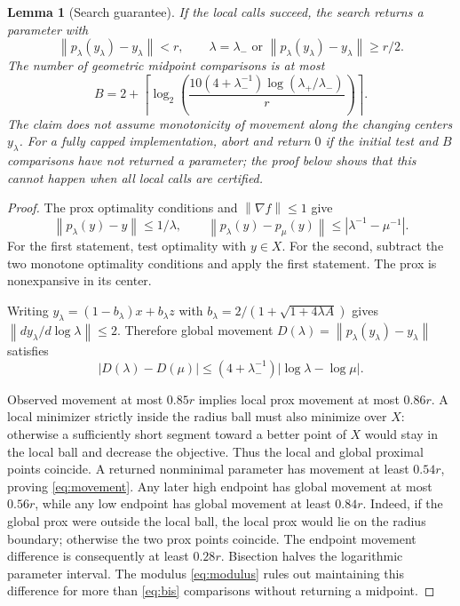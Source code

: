 \documentclass[11pt,a4paper]{article}
\newtheorem{lemma}[theorem]{Lemma}
\theoremstyle{definition}\newtheorem{definition}[theorem]{Definition}
\theoremstyle{remark}\newtheorem{remark}[theorem]{Remark}
\newcommand{\norm}[1]{\left\|#1\right\|}
\begin{document}
\begin{lemma}[Search guarantee]\label{lem:search}
If the local calls succeed, the search returns a parameter with
\begin{equation}\label{eq:movement}
 \norm{p_\lambda(y_\lambda)-y_\lambda}<r,
 \qquad \lambda=\lambda_-\text{ or }
 \norm{p_\lambda(y_\lambda)-y_\lambda}\ge r/2.
\end{equation}
The number of geometric midpoint comparisons is at most
\begin{equation}\label{eq:bis}
 B=2+\left\lceil\log_2\!\left(
 \frac{10(4+\lambda_-^{-1})\log(\lambda_+/\lambda_-)}{r}
 \right)\right\rceil.
\end{equation}
The claim does not assume monotonicity of movement along the changing centers $y_\lambda$. For a fully capped implementation, abort and return $0$ if the initial test and $B$ comparisons have not returned a parameter; the proof below shows that this cannot happen when all local calls are certified.
\end{lemma}
\begin{proof}
The prox optimality conditions and $\norm{\nabla f}\le1$ give
\begin{equation}\label{eq:proxproperties}
 \norm{p_\lambda(y)-y}\le1/\lambda,\qquad
 \norm{p_\lambda(y)-p_\mu(y)}\le|\lambda^{-1}-\mu^{-1}|.
\end{equation}
For the first statement, test optimality with $y\in X$. For the second, subtract the two monotone optimality conditions and apply the first statement. The prox is nonexpansive in its center.

Writing $y_\lambda=(1-b_\lambda)x+b_\lambda z$ with
$b_\lambda=2/(1+\sqrt{1+4\lambda A})$ gives
$\norm{dy_\lambda/d\log\lambda}\le2$. Therefore global movement
$D(\lambda)=\norm{p_\lambda(y_\lambda)-y_\lambda}$ satisfies
\begin{equation}\label{eq:modulus}
 |D(\lambda)-D(\mu)|
 \le(4+\lambda_-^{-1})|\log\lambda-\log\mu|.
\end{equation}

Observed movement at most $0.85r$ implies local prox movement at most $0.86r$. A local minimizer strictly inside the radius ball must also minimize
over $X$: otherwise a sufficiently short segment toward a better point
of $X$ would stay in the local ball and decrease the objective.
Thus the local and global proximal points coincide. A returned nonminimal parameter has movement at least $0.54r$, proving \eqref{eq:movement}. Any later high endpoint has global movement at most $0.56r$, while any low endpoint has global movement at least $0.84r$. Indeed, if the global prox were outside the local ball, the local prox would lie on the radius boundary; otherwise the two prox points coincide. The endpoint movement difference is consequently at least $0.28r$. Bisection halves the logarithmic parameter interval. The modulus \eqref{eq:modulus} rules out maintaining this difference for more than \eqref{eq:bis} comparisons without returning a midpoint.
\end{proof}
\end{document}

